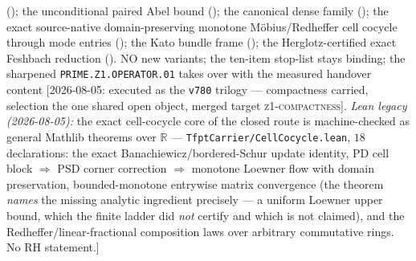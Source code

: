 \documentclass[11pt,a4paper]{article}
\begin{document}
{{(); the unconditional paired Abel
bound (); the canonical dense
family (); the exact
source-native domain-preserving monotone M\"obius/Redheffer cell
cocycle through mode entries ();
the Kato bundle frame (); the
Herglotz-certified exact Feshbach reduction
().  NO new variants; the
ten-item stop-list stays binding; the sharpened
\texttt{PRIME.Z1.OPERATOR.01} takes over with the measured
handover content [2026-08-05: executed as the \texttt{v780}
trilogy --- compactness carried, selection the one shared open
object, merged target \textsc{z1-compactness}].  \emph{Lean legacy
(2026-08-05):} the exact cell-cocycle core of the closed route is
machine-checked as general Mathlib theorems over $\mathbb R$ ---
\texttt{TfptCarrier/CellCocycle.lean}, $18$ declarations: the
exact Banachiewicz/bordered-Schur update identity, PD cell block
$\Rightarrow$ PSD corner correction $\Rightarrow$ monotone Loewner
flow with domain preservation, bounded-monotone entrywise matrix
convergence (the theorem \emph{names} the missing analytic
ingredient precisely --- a uniform Loewner upper bound, which the
finite ladder did \emph{not} certify and which is not claimed),
and the Redheffer/linear-fractional composition laws over
arbitrary commutative rings.  No RH statement.]}\par}
\end{document}
